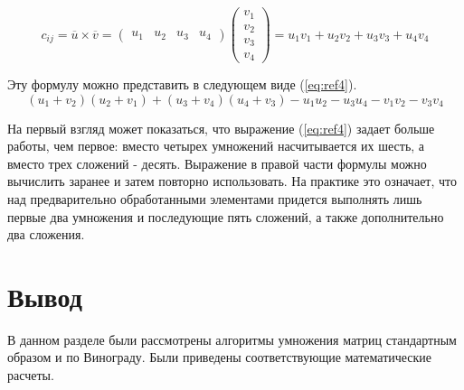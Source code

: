 \begin{equation}
	c_{ij} = \overline{u} \times \overline{v} =
	\begin{pmatrix} u_{1} & u_{2} & u_{3} & u_{4}\end{pmatrix}
	\begin{pmatrix} v_{1} \\ v_{2} \\ v_{3} \\ v_{4}\end{pmatrix} =
	u_{1}v_{1} + u_{2}v_{2} + u_{3}v_{3} + u_{4}v_{4}
	\label{eq:ref3}
\end{equation}

Эту формулу можно представить в следующем виде (\ref{eq:ref4}).
\begin{equation}
	(u_{1}+v_{2})(u_{2}+v_{1}) + (u_{3}+v_{4})(u_{4}+v_{3}) - u_{1}u_{2} - u_{3}u_{4} - v_{1}v_{2} - v_{3}v_{4}
	\label{eq:ref4}
\end{equation}

На первый взгляд  может показаться, что выражение (\ref{eq:ref4}) задает больше работы, чем первое: вместо четырех умножений насчитывается их шесть, а вместо трех сложений - десять. Выражение в правой части формулы  можно вычислить заранее и затем повторно использовать. На практике это означает, что над предварительно обработанными элементами придется выполнять лишь первые два умножения и последующие пять сложений, а также дополнительно два сложения.

\section{Вывод}
В данном разделе были рассмотрены алгоритмы умножения матриц стандартным образом и по Винограду. Были приведены соответствующие математические расчеты.